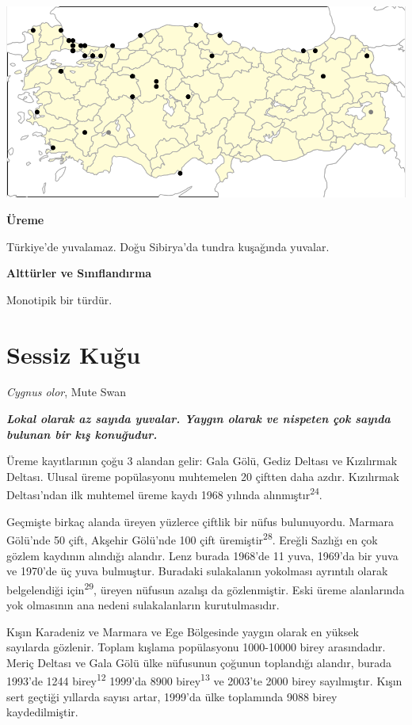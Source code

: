 \documentclass[
  letterpaper,
  DIV=11,
  numbers=noendperiod]{scrreprt}
\begin{document}
\includegraphics[width=6.25in,height=\textheight]{images/harita_Branta_ruficollis.png}

\textbf{Üreme}

Türkiye'de yuvalamaz. Doğu Sibirya'da tundra kuşağında yuvalar.

\textbf{Alttürler ve Sınıflandırma}

Monotipik bir türdür.

\section{Sessiz Kuğu}\label{sessiz-kuux11fu}

\emph{Cygnus olor}, Mute Swan

\textbf{\emph{Lokal olarak az sayıda yuvalar. Yaygın olarak ve nispeten
çok sayıda bulunan bir kış konuğudur.}}

Üreme kayıtlarının çoğu 3 alandan gelir: Gala Gölü, Gediz Deltası ve
Kızılırmak Deltası. Ulusal üreme popülasyonu muhtemelen 20 çiftten daha
azdır. Kızılırmak Deltası'ndan ilk muhtemel üreme kaydı 1968 yılında
alınmıştır\textsuperscript{24}.

Geçmişte birkaç alanda üreyen yüzlerce çiftlik bir nüfus bulunuyordu.
Marmara Gölü'nde 50 çift, Akşehir Gölü'nde 100 çift
üremiştir\textsuperscript{28}. Ereğli Sazlığı en çok gözlem kaydının
alındığı alandır. Lenz burada 1968'de 11 yuva, 1969'da bir yuva ve
1970'de üç yuva bulmuştur. Buradaki sulakalanın yokolması ayrıntılı
olarak belgelendiği için\textsuperscript{29}, üreyen nüfusun azalışı da
gözlenmiştir. Eski üreme alanlarında yok olmasının ana nedeni
sulakalanların kurutulmasıdır.

Kışın Karadeniz ve Marmara ve Ege Bölgesinde yaygın olarak en yüksek
sayılarda gözlenir. Toplam kışlama popülasyonu 1000-10000 birey
arasındadır. Meriç Deltası ve Gala Gölü ülke nüfusunun çoğunun
toplandığı alandır, burada 1993'de 1244 birey\textsuperscript{12}
1999'da 8900 birey\textsuperscript{13} ve 2003'te 2000 birey
sayılmıştır. Kışın sert geçtiği yıllarda sayısı artar, 1999'da ülke
toplamında 9088 birey kaydedilmiştir.
\end{document}
